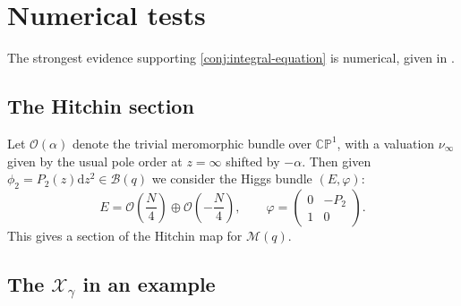 \documentclass[12pt,letterpaper,reqno]{article}
\numberwithin{equation}{section}
\newcommand{\cB}{\ensuremath{\mathcal B}}
\newcommand{\cM}{\ensuremath{\mathcal M}}
\newcommand{\cO}{\ensuremath{\mathcal O}}
\newcommand{\cX}{\ensuremath{\mathcal X}}
\newcommand{\bbR}{\ensuremath{\mathbb R}}
\newcommand{\bbC}{\ensuremath{\mathbb C}}
\newcommand{\bbP}{\ensuremath{\mathbb P}}
\newcommand{\de}{\mathrm{d}}
\newcommand{\abs}[1]{\lvert#1\rvert}
\newcommand{\ti}[1]{\textit{#1}}
\newcommand{\PSL}{\mathrm{PSL}}
\newcommand{\insfig}[2]{

\medskip
\noindent
\begin{minipage}{\linewidth}

\makebox[\linewidth]{\texttt{[image: figures/\#1-crop.pdf]}}

\end{minipage}
\medskip

}
\begin{document}
\section{Numerical tests}

The strongest evidence supporting \autoref{conj:integral-equation} is numerical,
given in \cite{dumas2020opers}.

\subsection{The Hitchin section}

\begin{defn}
Let $\cO(\alpha)$ denote the trivial meromorphic bundle over $\bbC \bbP^1$, 
with a valuation $\nu_\infty$ given by the usual pole order at $z = \infty$ 
shifted by $-\alpha$.
Then given $\phi_2 = P_2(z) \de z^2 \in \cB(q)$ we consider the Higgs bundle
$(E,\varphi)$:
\begin{equation}
  E = \cO\left(\frac{N}{4}\right) \oplus \cO\left(-\frac{N}{4}\right), \qquad \varphi = \begin{pmatrix} 0 & -P_2 \\ 1 & 0 \end{pmatrix}.
\end{equation}
This gives a section of the Hitchin map for $\cM(q)$.
\end{defn}




\subsection{The \texorpdfstring{$\cX_\gamma$}{Xgamma} in an example}

\end{document}
